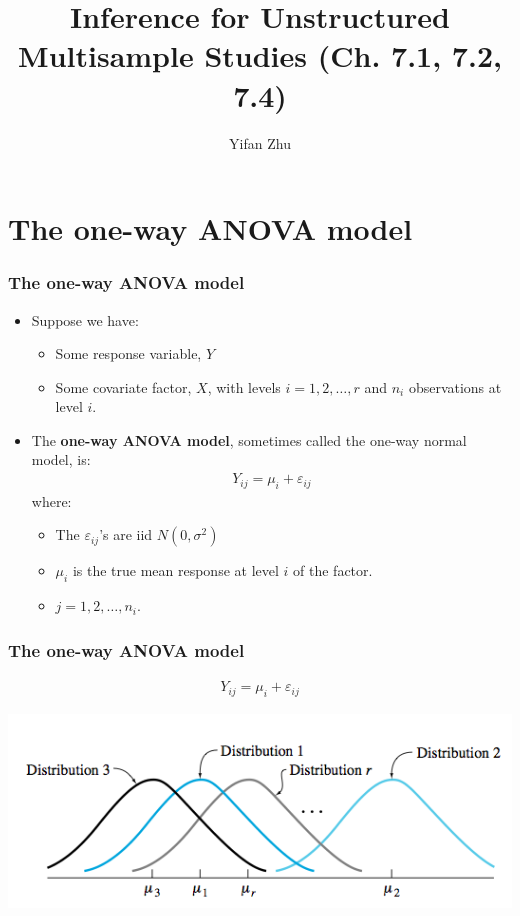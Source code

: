 \documentclass[handout]{beamer}\usepackage[]{graphicx}\usepackage[]{color}
\title{Inference for Unstructured Multisample Studies (Ch. 7.1, 7.2, 7.4)}
\author{Yifan Zhu}
\date{}
\institute{Iowa State University}
\providecommand{\e}{\varepsilon}
\numberwithin{equation}{section}
\begin{document}
\begin{frame}
\titlepage
 \end{frame}
 

\section{The one-way ANOVA model}

\begin{frame}
\frametitle{The one-way ANOVA model}
\begin{itemize}
\item Suppose we have:
\begin{itemize}
\pause \item Some response variable, $Y$
\pause \item Some covariate factor, $X$, with levels $i = 1, 2, \ldots, r$ and $n_i$ observations at level $i$.
\end{itemize}
\pause \item The {\bf one-way ANOVA model}, sometimes called the one-way normal model, is:
\pause \begin{align*}
Y_{ij} = \mu_{i} + \e_{ij}
\end{align*}
where:
\begin{itemize}
\pause \item The $\e_{ij}$'s are iid $N(0,\sigma^2)$
\pause \item $\mu_i$ is the true mean response at level $i$ of the factor.
\pause \item $j = 1, 2, \ldots, n_i$.
\end{itemize}
\end{itemize}
\end{frame}


\begin{frame}
\frametitle{The one-way ANOVA model}
 \begin{align*}
Y_{ij} = \mu_i + \e_{ij}
\end{align*}
\begin{center}
 \includegraphics{../../fig/modelsnormal.png}
\end{center}
\end{frame}
\end{document}
